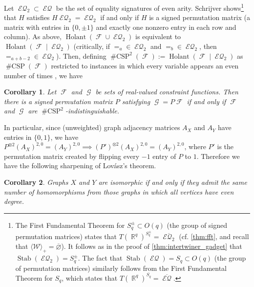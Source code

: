\documentclass{article}
\newtheorem{corollary}{Corollary}[section]
\theoremstyle{remark}
\theoremstyle{definition}
\DeclareMathOperator{\rr}{\mathbb{R}}
\DeclareMathOperator{\fc}{\mathcal{F}}
\DeclareMathOperator{\gc}{\mathcal{G}}
\DeclareMathOperator{\stab}{Stab}
\DeclareMathOperator{\holant}{Holant}
\DeclareMathOperator{\csp}{\#CSP}
\DeclareMathOperator{\eq}{\mathcal{EQ}}
\begin{document}
Let $\eq_2 \subset \eq$ be the set of equality signatures of even arity. 
Schrijver \cite{schrijver_tensor_2008} 
shows\footnote{The First Fundamental Theorem for $S_q^{\pm} \subset O(q)$ (the group of signed
    permutation matrices) states that $T(\rr^q)^{S_q^{\pm}} = \overline{\eq_2}$
    (cf. \autoref{thm:fft}, and recall that $\langle \mathcal{W} \rangle_+ = \overline{\varnothing}$).
    It follows as in the proof of \autoref{thm:intertwiner_gadget} that $\stab(\eq_2) = S_q^{\pm}$.
    The fact that $\stab(\eq) = S_q \subset O(q)$ (the group of permutation matrices) similarly follows
    from the First Fundamental Theorem for $S_q$, which states that
    $T(\rr^q)^{S_q} = \overline{\eq}$.
}
that $H$
satisfies $H\eq_2 = \eq_2$ if and only if $H$ is a signed permutation matrix (a matrix with entries
in $\{0,\pm 1\}$ and exactly one nonzero entry in each row and column). As above,
$\holant(\fc \cup \eq_2)$ is equivalent to $\holant(\fc \mid \eq_2)$ (critically, if $=_a \in \eq_2$
and $=_b \in \eq_2$, then $=_{a+b-2} \in \eq_2$). Then, defining $\csp^2(\fc) := \holant(\fc \mid \eq_2)$ as $\csp(\fc)$
restricted to instances in which every variable appears an even number of times \cite{cai2015holant,huang_2016_dichotomy}, we have
\begin{corollary}
    Let $\fc$ and $\gc$ be sets of real-valued constraint functions.
    Then there is a signed permutation matrix $P$ satisfying $\gc = P\fc$ if and only if
    $\fc$ and $\gc$ are $\csp^2$-indistinguishable.
\end{corollary}
In particular, since (unweighted) graph adjacency matrices $A_X$ and $A_Y$ have entries in $\{0,1\}$,
we have $P^{\otimes 2}(A_X)^{2,0} = (A_Y)^{2,0} \implies 
    (P')^{\otimes 2}(A_X)^{2,0} = (A_Y)^{2,0}$,
where $P'$ is the permutation matrix created by flipping every $-1$ entry of $P$ to $1$. Therefore
we have the following sharpening of Lovász's theorem.
\begin{corollary}
    Graphs $X$ and $Y$ are isomorphic if and only if they admit the same number of homomorphisms
    from those graphs in which all vertices have even degree.
\end{corollary}
\end{document}
